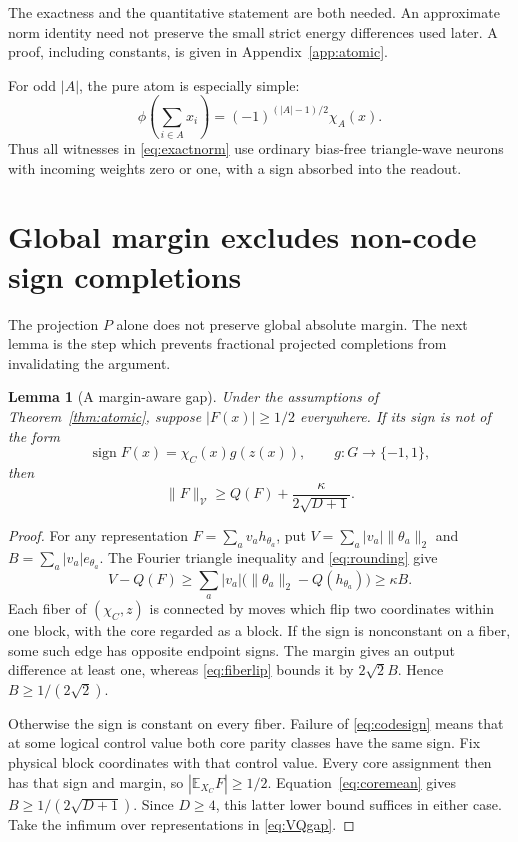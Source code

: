 \documentclass[11pt]{article}
\newtheorem{lemma}[theorem]{Lemma}
\newcommand{\E}{\mathbb E}
\newcommand{\sgn}{\operatorname{sign}}
\newcommand{\cV}{\mathcal V}
\begin{document}
The exactness and the quantitative statement are both needed. An
approximate norm identity need not preserve the small strict energy
differences used later. A proof, including constants, is given in
Appendix~\ref{app:atomic}.

For odd $|A|$, the pure atom is especially simple:
\begin{equation}\label{eq:pureparity}
 \phi\!\left(\sum_{i\in A}x_i\right)
       =(-1)^{(|A|-1)/2}\chi_A(x).
\end{equation}
Thus all witnesses in \eqref{eq:exactnorm} use ordinary bias-free
triangle-wave neurons with incoming weights zero or one, with a sign
absorbed into the readout.

\section{Global margin excludes non-code sign completions}

The projection $P$ alone does not preserve global absolute margin.
The next lemma is the step which prevents fractional projected
completions from invalidating the argument.

\begin{lemma}[A margin-aware gap]\label{lem:offcode}
Under the assumptions of Theorem~\ref{thm:atomic}, suppose
$|F(x)|\ge1/2$ everywhere. If its sign is not of the form
\begin{equation}\label{eq:codesign}
 \sgn F(x)=\chi_C(x)g(z(x)),\qquad g:G\to\{-1,1\},
\end{equation}
then
\begin{equation}\label{eq:offcodegap}
 \|F\|_{\cV}\ge Q(F)+\frac{\kappa}{2\sqrt{D+1}}.
\end{equation}
\end{lemma}
\begin{proof}
For any representation $F=\sum_a v_a h_{\theta_a}$, put
$V=\sum_a|v_a|\|\theta_a\|_2$ and
$B=\sum_a|v_a|e_{\theta_a}$. The Fourier triangle inequality and
\eqref{eq:rounding} give
\begin{equation}\label{eq:VQgap}
 V-Q(F)\ge\sum_a|v_a|\bigl(\|\theta_a\|_2-Q(h_{\theta_a})\bigr)
       \ge\kappa B.
\end{equation}
Each fiber of $(\chi_C,z)$ is connected by moves which flip two
coordinates within one block, with the core regarded as a block.
If the sign is nonconstant on a fiber, some such edge has opposite
endpoint signs. The margin gives an output difference at least one,
whereas \eqref{eq:fiberlip} bounds it by $2\sqrt2 B$. Hence
$B\ge1/(2\sqrt2)$.

Otherwise the sign is constant on every fiber. Failure of
\eqref{eq:codesign} means that at some logical control value both core
parity classes have the same sign. Fix physical block coordinates with
that control value. Every core assignment then has that sign and
margin, so $|\E_{X_C}F|\ge1/2$. Equation~\eqref{eq:coremean} gives
$B\ge1/(2\sqrt{D+1})$. Since $D\ge4$, this latter lower bound suffices
in either case. Take the infimum over representations in
\eqref{eq:VQgap}.
\end{proof}
\end{document}
